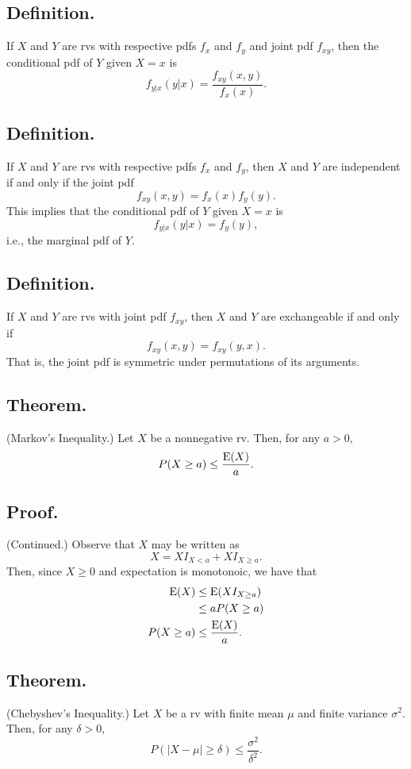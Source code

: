 \documentclass[titlepage]{article}
\begin{document}
\subsection{Definition.} If $X$ and $Y$ are rvs with respective pdfs $f_{x}$ and $f_{y}$ and joint pdf $f_{xy}$, then the conditional pdf of $Y$ given $X = x$ is
$$f_{y|x}(y|x) = \frac{f_{xy}(x, y)}{f_{x}(x)}.$$

\subsection{Definition.} If $X$ and $Y$ are rvs with respective pdfs $f_{x}$ and $f_{y}$, then $X$ and $Y$ are independent if and only if the joint pdf 
$$f_{xy}(x, y) = f_{x}(x)f_{y}(y).$$
This implies that the conditional pdf of $Y$ given $X = x$ is
$$f_{y|x}(y|x) = f_{y}(y),$$
i.e., the marginal pdf of $Y$.

\subsection{Definition.} If $X$ and $Y$ are rvs with joint pdf $f_{xy}$, then $X$ and $Y$ are exchangeable if and only if 
$$f_{xy}(x, y) = f_{xy}(y, x).$$
That is, the joint pdf is symmetric under permutations of its arguments.

\subsection{Theorem.} (Markov's Inequality.) Let $X$ be a nonnegative rv. Then, for any $a > 0$, 
$$P(X \geq a) \leq \frac{\text{E}(X)}{a}.$$

\subsection{Proof.} (Continued.) Observe that $X$ may be written as 
$$X = XI_{X < a} + XI_{X \geq a}.$$
Then, since $X \geq 0$ and expectation is monotonoic, we have that 
\begin{align*}
          \text{E}(X) &\leq \text{E}(XI_{X \geq a}) \\
                &\leq aP(X \geq a) \\
    P(X \geq a) &\leq \frac{\text{E}(X)}{a}.
\end{align*}

\subsection{Theorem.} (Chebyshev's Inequality.) Let $X$ be a rv with finite mean $\mu$ and finite variance $\sigma^{2}$. Then, for any $\delta > 0$, 
$$P(|X - \mu| \geq \delta) \leq \frac{\sigma^{2}}{\delta^{2}}.$$
\end{document}
